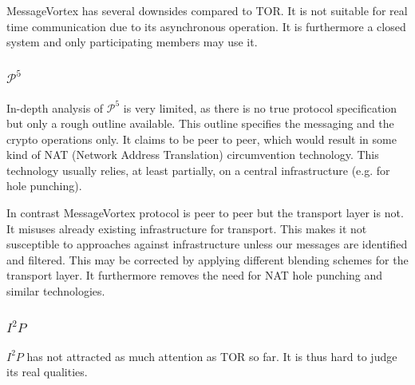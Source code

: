 \documentclass[9pt,journal,compsoc]{IEEEtran}
\begin{document}
MessageVortex has several downsides compared to TOR. It is not suitable for real time communication due to its asynchronous operation. It is furthermore a closed system and only participating members may use it. %

\subsubsection{$\mathcal{P}^5$}
%
In-depth analysis of $\mathcal{P}^5$ is very limited, as there is no true protocol specification but only a rough outline available. This outline specifies the messaging and the crypto operations only. It claims to be peer to peer, which would result in some kind of NAT (Network Address Translation) circumvention technology. This technology usually relies, at least partially, on a central infrastructure (e.g. for hole punching). 

In contrast MessageVortex protocol is peer to peer but the transport layer is not. It misuses already existing infrastructure for transport. This makes it not susceptible to approaches against infrastructure unless our messages are identified and filtered. This may be corrected by applying different blending schemes for the transport layer. It furthermore removes the need for NAT hole punching and similar technologies.

\subsubsection{$I^2P$}
%
$I^2P$ has not attracted as much attention as TOR so far. It is thus hard to judge its real qualities. 
\end{document}
